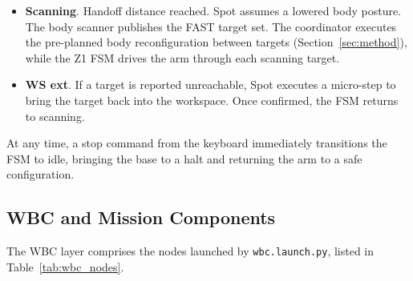 \begin{itemize}
        grid concurrently with base motion. A global timeout guards against
        unreachable targets, aborting to idle if Spot fails to reach the
        handoff distance.
  \item \textbf{Scanning}. Handoff distance reached. Spot assumes a lowered
        body posture. The body scanner publishes the FAST target set. The
        coordinator executes the pre-planned body reconfiguration between
        targets (Section~\ref{sec:method}), while the Z1 \ac{FSM} drives
        the arm through each scanning target.
  \item \textbf{WS ext}. If a target is reported unreachable, Spot
        executes a micro-step to bring the target back into the workspace.
        Once confirmed, the \ac{FSM} returns to scanning.
\end{itemize}

At any time, a stop command from the keyboard immediately transitions the
\ac{FSM} to idle, bringing the base to a halt and returning the arm to a
safe configuration.

\subsection{WBC and Mission Components}

The \ac{WBC} layer comprises the nodes launched by
\texttt{wbc.launch.py}, listed in Table~\ref{tab:wbc_nodes}.

\begin{table}[t]
  \centering
  \caption{\ac{WBC} and mission orchestration nodes.}
  \label{tab:wbc_nodes}
\end{table}

